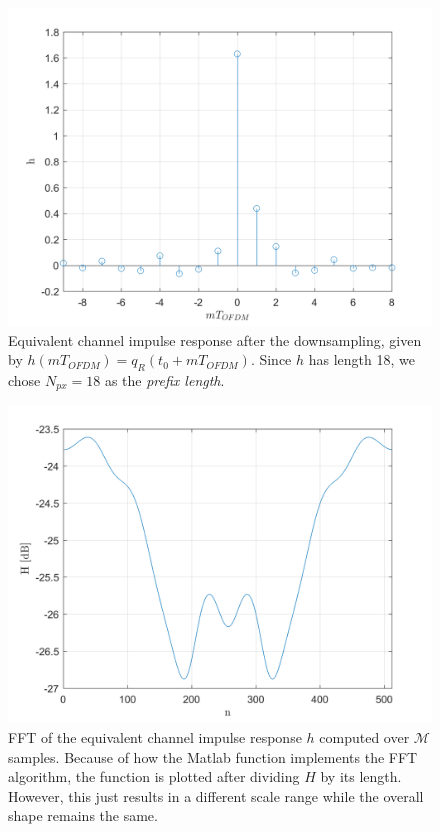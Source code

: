 \documentclass[a4paper, 12pt]{report}
\begin{document}
\begin{figure}[H]
	\centering
	\includegraphics[width=14cm]{h}
	\caption{Equivalent channel impulse response after the downsampling, given by $h(mT_{OFDM}) = q_R(t_0+mT_{OFDM})$. Since $h$ has length 18, we chose $N_{px}=18$ as the \textit{prefix length}.}\label{h}
\end{figure}

\begin{figure}[H]
	\centering
	\includegraphics[width=14cm]{H_fft}
	\caption{FFT of the equivalent channel impulse response $h$ computed over $\mathcal{M}$ samples. Because of how the Matlab function implements the FFT algorithm, the function is plotted after dividing $H$ by its length. However, this just results in a different scale range while the overall shape remains the same.}\label{H_fft}
\end{figure}
\end{document}
